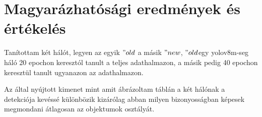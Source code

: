\documentclass[12pt,oneside,a4paper]{article}
\newcommand{\newsection}[1]{\clearpage\section{#1}}\label{makro}
\theoremstyle{remark}
\newcommand{\oldh}{\("old\)}\label{makro2}
\newcommand{\newh}{\("new\)}
\begin{document}
\newsection{Magyarázhatósági eredmények és értékelés}\label{sec:magyarazhatosagi-eredmenyek-es-ertekeles}
    Tanítottam két hálót, legyen az egyik \oldh\label{makrohasznalat} a másik \newh, \oldh egy yolov8m-seg háló 20 epochon keresztól tanult
    a teljes adathalmazon, a másik pedig 40 epochon keresztül tanult ugyanazon az adathalmazon.

    Az  által nyújtott kimenet mint amit ábrázoltam  táblán\label{hivatkozas} a két hálónak a detekciója
    kevéssé különbözik kizárólag abban milyen bizonyosságban képesek megmondani átlagosan az objektumok osztályát.
\end{document}
